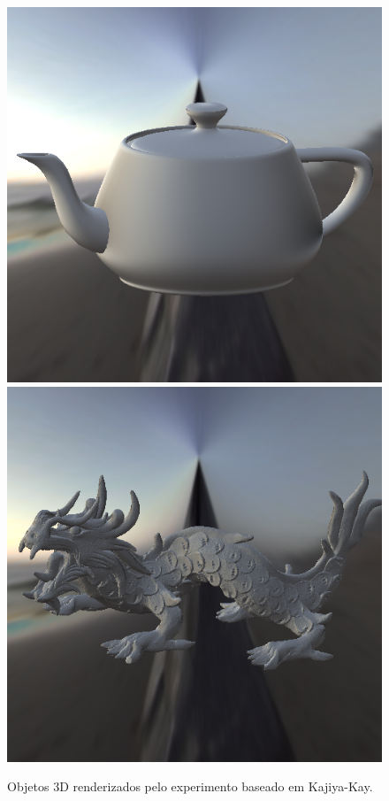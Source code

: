 \begin{figure}[H]
    \caption{\small{Objetos 3D renderizados pelo experimento baseado em Kajiya-Kay.}}
    \label{fig-kajiya-objects}
  \includegraphics[width=\linewidth]{./Imagens/brdfs/aniso-teapot.png}
\endminipage\hfill
{}
  \includegraphics[width=\linewidth]{./Imagens/brdfs/aniso-dragon.png}

\end{figure}

